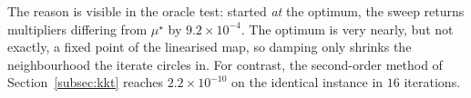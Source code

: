 \noindent
The reason is visible in the oracle test: started \emph{at} the optimum, the
sweep returns multipliers differing from $\mu^\star$ by $9.2\times10^{-4}$.  The
optimum is very nearly, but not exactly, a fixed point of the linearised map, so
damping only shrinks the neighbourhood the iterate circles in.  For contrast,
the second-order method of Section~\ref{subsec:kkt} reaches
$2.2\times10^{-10}$ on the identical instance in $16$ iterations.
